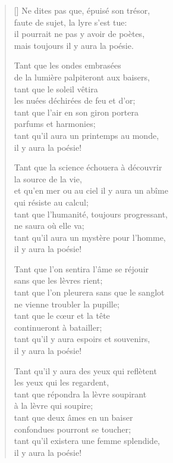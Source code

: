 \documentclass[a4paper,12pt]{book}
\begin{document}
\settowidth{\versewidth}{tant qu'il existera une femme splendide,}

\begin{verse}[\versewidth]
  Ne dites pas que, épuisé son trésor, \\
  faute de sujet, la lyre s'est tue: \\
  il pourrait ne pas y avoir de poètes, \\
  mais toujours il y aura la poésie.

  Tant que les ondes embrasées \\
  de la lumière palpiteront aux baisers, \\
  tant que le soleil vêtira \\
  les nuées déchirées de feu et d'or; \\
  tant que l'air en son giron portera \\
  parfums et harmonies; \\
  tant qu'il aura un printemps au monde, \\
  il y aura la poésie!

  Tant que la science échouera à découvrir \\
  la source de la vie, \\
  et qu'en mer ou au ciel il y aura un abîme \\
  qui résiste au calcul; \\
  tant que l'humanité, toujours progressant, \\
  ne saura où elle va; \\
  tant qu'il aura un mystère pour l'homme, \\
  il y aura la poésie!

  Tant que l'on sentira l'âme se réjouir \\
  sans que les lèvres rient; \\
  tant que l'on pleurera sans que le sanglot \\
  ne vienne troubler la pupille; \\
  tant que le cœur et la tête \\
  continueront à batailler; \\
  tant qu'il y aura espoirs et souvenirs, \\
  il y aura la poésie!

  Tant qu'il y aura des yeux qui reflètent \\
  les yeux qui les regardent, \\
  tant que répondra la lèvre soupirant \\
  à la lèvre qui soupire; \\
  tant que deux âmes en un baiser \\
  confondues pourront se toucher; \\
  tant qu'il existera une femme splendide, \\
  il y aura la poésie!
\end{verse}
\end{document}
